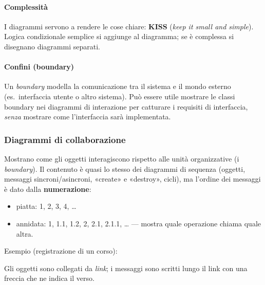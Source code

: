 \documentclass[a4paper,12pt]{article}
\begin{document}
\paragraph{Complessità}
I diagrammi servono a rendere le cose chiare: \textbf{KISS} (\emph{keep it small and
simple}). Logica condizionale semplice si aggiunge al diagramma; se è complessa si
disegnano diagrammi separati.

\paragraph{Confini (boundary)}
Un \emph{boundary} modella la comunicazione tra il sistema e il mondo esterno (es.\
interfaccia utente o altro sistema). Può essere utile mostrare le classi boundary nei
diagrammi di interazione per catturare i requisiti di interfaccia, \emph{senza}
mostrare come l'interfaccia sarà implementata.

\subsubsection{Diagrammi di collaborazione}
Mostrano come gli oggetti interagiscono rispetto alle unità organizzative (i
\emph{boundary}). Il contenuto è quasi lo stesso dei diagrammi di sequenza (oggetti,
messaggi sincroni/asincroni, «create» e
«destroy», cicli), ma l'ordine dei messaggi è dato dalla
\textbf{numerazione}:
\begin{itemize}
  \item piatta: 1, 2, 3, 4, \ldots
  \item annidata: 1, 1.1, 1.2, 2, 2.1, 2.1.1, \ldots{} --- mostra quale operazione
        chiama quale altra.
\end{itemize}

Esempio (registrazione di un corso):
\begin{center}
\end{center}
Gli oggetti sono collegati da \emph{link}; i messaggi sono scritti lungo il link con una
freccia che ne indica il verso.
\end{document}
